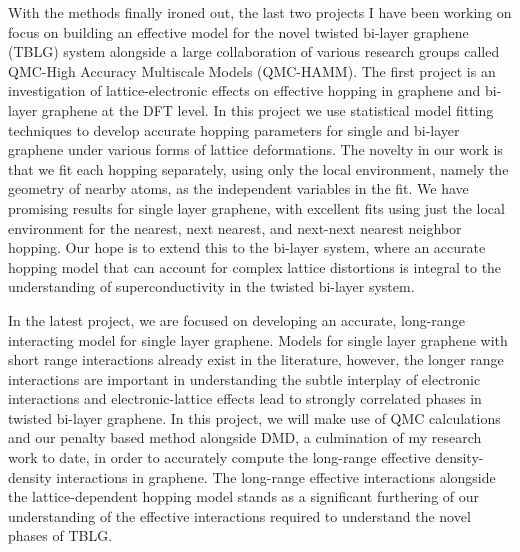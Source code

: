 \documentclass{article}
\begin{document}
With the methods finally ironed out, the last two projects I have been working on focus on building an effective model for the novel twisted bi-layer graphene (TBLG) system alongside a large collaboration of various research groups called QMC-High Accuracy Multiscale Models (QMC-HAMM).
The first project is an investigation of lattice-electronic effects on effective hopping in graphene and bi-layer graphene at the DFT level.
In this project we use statistical model fitting techniques to develop accurate hopping parameters for single and bi-layer graphene under various forms of lattice deformations.
The novelty in our work is that we fit each hopping separately, using only the local environment, namely the geometry of nearby atoms, as the independent variables in the fit.
We have promising results for single layer graphene, with excellent fits using just the local environment for the nearest, next nearest, and next-next nearest neighbor hopping.
Our hope is to extend this to the bi-layer system, where an accurate hopping model that can account for complex lattice distortions is integral to the understanding of superconductivity in the twisted bi-layer system.

In the latest project, we are focused on developing an accurate, long-range interacting model for single layer graphene.
Models for single layer graphene with short range interactions already exist in the literature, however, the longer range interactions are important in understanding the subtle interplay of electronic interactions and electronic-lattice effects lead to strongly correlated phases in twisted bi-layer graphene.
In this project, we will make use of QMC calculations and our penalty based method alongside DMD, a culmination of my research work to date, in order to accurately compute the long-range effective density-density interactions in graphene.
The long-range effective interactions alongside the lattice-dependent hopping model stands as a significant furthering of our understanding of the effective interactions required to understand the novel phases of TBLG.
\end{document}
